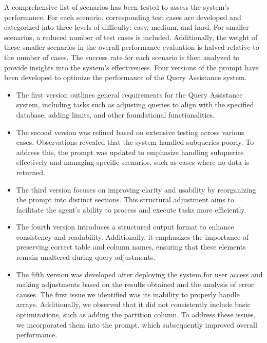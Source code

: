     A comprehensive list of scenarios has been tested to assess the system's performance. For each scenario, corresponding test cases are developed and categorized into three levels of difficulty: easy, medium, and hard. For smaller scenarios, a reduced number of test cases is included. Additionally, the weight of these smaller scenarios in the overall performance evaluation is halved relative to the number of cases. The success rate for each scenario is then analyzed to provide insights into the system's effectiveness. Four versions of the prompt have been developed to optimize the performance of the Query Assistance system.
    \begin{itemize}
        \item The first version outlines general requirements for the Query Assistance system, including tasks such as adjusting queries to align with the specified database, adding limits, and other foundational functionalities.
        \item The second version was refined based on extensive testing across various cases. Observations revealed that the system handled subqueries poorly. To address this, the prompt was updated to emphasize handling subqueries effectively and managing specific scenarios, such as cases where no data is returned.
        \item The third version focuses on improving clarity and usability by reorganizing the prompt into distinct sections. This structural adjustment aims to facilitate the agent's ability to process and execute tasks more efficiently.
        \item The fourth version introduces a structured output format to enhance consistency and readability. Additionally, it emphasizes the importance of preserving correct table and column names, ensuring that these elements remain unaltered during query adjustments.
        \item The fifth version was developed after deploying the system for user access and making adjustments based on the results obtained and the analysis of error causes. The first issue we identified was its inability to properly handle arrays. Additionally, we observed that it did not consistently include basic optimizations, such as adding the partition column. To address these issues, we incorporated them into the prompt, which subsequently improved overall performance.
    \end{itemize}
